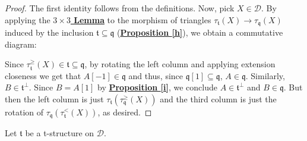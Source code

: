 \begin{proof}
The first identity follows from the definitions. Now, pick $X \in \mathscr{D}$. By applying the \hyperref[s]{\textbf{$3 \times 3$ Lemma}} to the morphism of triangles $\tau_{\mathfrak{t}}(X) \longrightarrow \tau_{\mathfrak{q}}(X)$ induced by the inclusion $\mathfrak{t} \subseteq \mathfrak{q}$ (\hyperref[h]{\textbf{Proposition \ref*{h}}}), we obtain a commutative diagram: 

\begin{center}
\end{center}
Since $\tau^{\ge}_{\mathfrak{t}}(X) \in \mathfrak{t} \subseteq \mathfrak{q}$, by rotating the left column and applying extension closeness we get that $A[-1] \in \mathfrak{q}$ and thus, since $\mathfrak{q}[1] \subseteq \mathfrak{q}$, $A \in \mathfrak{q}$. Similarly, $B \in \mathfrak{t}^{\perp}$. Since $B=A[1]$ by \hyperref[i]{\textbf{Proposition \ref*{i}}}, we conclude $A \in \mathfrak{t}^{\perp}$ and $B \in \mathfrak{q}$. But then the left column is just $\tau_{\mathfrak{t}}(\tau^{\ge}_{\mathfrak{q}}(X))$ and the third column is just the rotation of $\tau_{\mathfrak{q}}(\tau^<_{\mathfrak{t}}(X))$, as desired. 
\end{proof}

Let $\mathfrak{t}$ be a t-structure on $\mathscr{D}$.  \\

